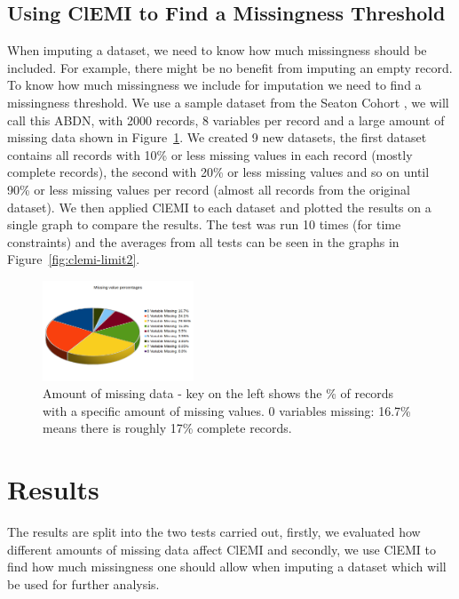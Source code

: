 \documentclass[conference,compsoc]{IEEEtran}
\begin{document}

	\subsection{Using ClEMI to Find a Missingness Threshold} %
	\label{sub:using_clemi_to_find_a_missingness_threshold}
	When imputing a dataset, we need to know how much missingness should be included. For example, there might be no benefit from imputing an empty record. To know how much missingness we include for imputation we need to find a missingness threshold. We use a sample dataset from the Seaton Cohort \cite{seaton}, we will call this ABDN, with 2000 records, 8 variables per record and a large amount of missing data shown in Figure~\ref{fig:missing}. We created 9 new datasets, the first dataset contains all records with 10\% or less missing values in each record (mostly complete records), the second with 20\% or less missing values and so on until 90\% or less missing values per record (almost all records from the original dataset). We then applied ClEMI to each dataset and plotted the results on a single graph to compare the results. The test was run 10 times (for time constraints) and the averages from all tests can be seen in the graphs in Figure~\ref{fig:clemi-limit2}.
	\\
	\begin{figure}[!ht]
		\centering
		\includegraphics[width=0.40\textwidth]{missing-perc-equal}
		\caption{Amount of missing data - key on the left shows the \% of records with a specific amount of missing values. 0 variables missing: 16.7\% means there is roughly 17\% complete records.}
		\label{fig:missing}
	\end{figure}


	\section{Results} %
	\label{sec:results}
	The results are split into the two tests carried out, firstly, we evaluated how different amounts of missing data affect ClEMI and secondly, we use ClEMI to find how much missingness one should allow when imputing a dataset which will be used for further analysis.
\end{document}
